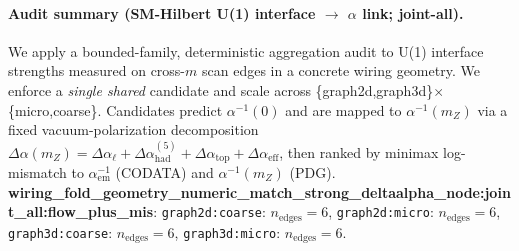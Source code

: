 \paragraph{Audit summary (SM-Hilbert U(1) interface $\to$ $\alpha$ link; joint-all).} \AuditTag We apply a bounded-family, deterministic aggregation audit to U(1) interface strengths measured on cross-$m$ scan edges in a concrete wiring geometry. We enforce a \emph{single shared} candidate and scale across \{graph2d,graph3d\}$\times$\{micro,coarse\}. Candidates predict $\alpha^{-1}(0)$ and are mapped to $\alpha^{-1}(m_Z)$ via a fixed vacuum-polarization decomposition $\Delta\alpha(m_Z)=\Delta\alpha_\ell+\Delta\alpha^{(5)}_{\mathrm{had}}+\Delta\alpha_{\mathrm{top}}+\Delta\alpha_{\mathrm{eff}}$, then ranked by minimax log-mismatch to $\alpha_{\mathrm{em}}^{-1}$ (CODATA) and $\alpha^{-1}(m_Z)$ (PDG). \textbf{wiring_fold_geometry_numeric_match_strong_deltaalpha_node:joint_all:flow_plus_mis}: \texttt{graph2d:coarse}: $n_{\mathrm{edges}}=6$, \texttt{graph2d:micro}: $n_{\mathrm{edges}}=6$, \texttt{graph3d:coarse}: $n_{\mathrm{edges}}=6$, \texttt{graph3d:micro}: $n_{\mathrm{edges}}=6$.